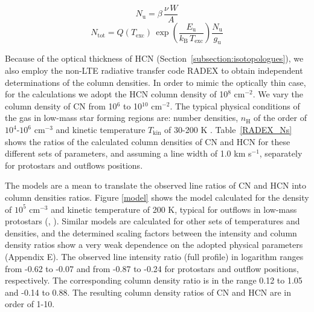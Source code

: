\documentclass{aa}
\begin{document}
\begin{equation} 
\label{eq3} N_\mathrm{u} = \beta \, \frac{\nu \,W}{A} 
\end{equation} 
\begin{equation} 
\label{eq4} N_\mathrm{tot} = Q(T_\mathrm{exc}) \, \exp(\frac{E_\mathrm{u}}{k_\mathrm{B} \, T_\mathrm{exc}}) \frac{N_\mathrm{u} }{g_\mathrm{u} } 
\end{equation} 

Because of the optical thickness of HCN (Section~\ref{subsection:isotopologues}), we also employ the non-LTE radiative transfer code RADEX 
to obtain independent determinations of the column densities. In order to mimic the optically thin case,
for the calculations we adopt the HCN column density of 10$^8$ cm$^{-2}$. We vary the column density 
of CN from 10$^6$ to 10$^{10}$ cm$^{-2}$. The typical physical conditions of the gas 
in low-mass star forming regions are: number densities, $n_\mathrm{H}$ of the order of $10^{4}$-$10^{6}$ cm$^{-3}$ 
and kinetic temperature $T_\mathrm{kin}$ of 30-200 K \citep{Mot14}. Table~\ref{RADEX_Ns} shows the ratios of the calculated 
column densities of CN and HCN for these different sets of parameters, and assuming a line width of 1.0 km s$^{-1}$, separately for protostars and outflows positions.

The models are a mean to translate the observed line ratios of CN and HCN into column densities ratios. 
Figure \ref{model} shows the model calculated for the density of $10^{5}$ cm$^{-3}$ and kinetic temperature 
of 200 K, typical for outflows in low-mass protostars (\citealt{vKe09b}, \citealt{Yil15}). Similar models are calculated for other sets of 
temperatures and densities, and the determined scaling factors between the intensity and column
density ratios show a very weak dependence on the adopted physical parameters (Appendix E). The observed line intensity ratio (full profile) 
in logarithm ranges from -0.62 to -0.07 and from -0.87 to -0.24 for protostars and outflow positions, respectively.
The corresponding column density ratio is
in the range 0.12 to 1.05 and -0.14 to 0.88. The resulting 
column density ratios of CN and HCN are in order of 1-10.
\end{document}
